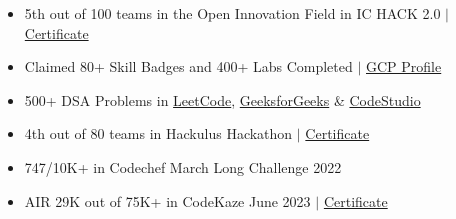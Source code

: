 \documentclass[letterpaper,11pt]{article}
\newcommand{\resumeItem}[1]{
  \item\small{
    {#1 \vspace{-2pt}}
  }
}
\newcommand{\resumeItemListStart}{\begin{itemize}}
\newcommand{\resumeItemListEnd}{\end{itemize}\vspace{-5pt}}
\begin{document}
    \begin{itemize}[leftmargin=0.15in, label={}]
    \small{\item{
    \resumeItemListStart
  \resumeItem{5th out of 100 teams in the Open Innovation Field in IC HACK 2.0 $|$ \href{https://drive.google.com/file/d/1SeL0qU6O4hFTnG8Ef7F7ifKkHy5lRoSG/view?usp=sharing}{Certificate}}
   \resumeItem{Claimed 80+ Skill Badges and 400+ Labs Completed $|$ \href{https://www.cloudskillsboost.google/public_profiles/27c0ba2b-577b-4d32-a506-64591e89e383}{GCP Profile}}
  \resumeItem{500+ DSA Problems in \href{https://leetcode.com/tarunbisht-24/}{LeetCode}, \href{https://auth.geeksforgeeks.org/user/tarunbisht24}{GeeksforGeeks} \& \href{https://www.codingninjas.com/codestudio/profile/a5f5fd68-00b2-4d69-99c9-bfdcee24eee2}{CodeStudio}}
  \resumeItem{4th out of 80 teams in Hackulus Hackathon $|$ \href{https://drive.google.com/file/d/18ciyyMktMdTX3gtiTdu328mGsj4R-QYG/view?usp=sharing}{Certificate}}
  \resumeItem{747/10K+ in Codechef March Long Challenge 2022}
  \resumeItem{AIR 29K out of 75K+ in CodeKaze June 2023 $|$ \href{https://drive.google.com/file/d/1mMD2lqFVsxjVfZL1JmhHwPu7hafmTqpd/view?usp=sharing}{Certificate}}
  
    \resumeItemListEnd
    }}
    \end{itemize}




\end{document}
